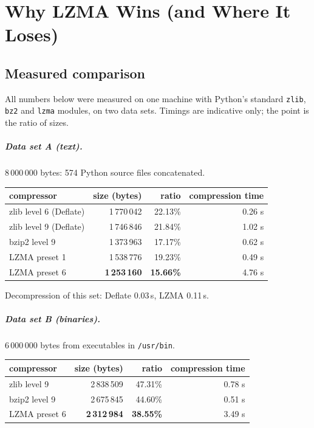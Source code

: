 \documentclass[11pt,a4paper,oneside]{book}
\begin{document}
\chapter{Why LZMA Wins (and Where It Loses)}

\section{Measured comparison}

All numbers below were measured on one machine with Python's standard \texttt{zlib}, \texttt{bz2} and \texttt{lzma} modules, on two data sets. Timings are
indicative only; the point is the ratio of sizes.

\paragraph{Data set A (text).} 8\,000\,000 bytes: 574 Python source files concatenated.
\begin{center}
\small
\begin{tabular}{lrrr}
\toprule
compressor & size (bytes) & ratio & compression time\\
\midrule
zlib level 6 (Deflate) & 1\,770\,042 & 22.13\% & 0.26 s\\
zlib level 9 (Deflate) & 1\,746\,846 & 21.84\% & 1.02 s\\
bzip2 level 9 & 1\,373\,963 & 17.17\% & 0.62 s\\
LZMA preset 1 & 1\,538\,776 & 19.23\% & 0.49 s\\
LZMA preset 6 & \textbf{1\,253\,160} & \textbf{15.66\%} & 4.76 s\\
\bottomrule
\end{tabular}
\end{center}
Decompression of this set: Deflate 0.03\,s, LZMA 0.11\,s.

\paragraph{Data set B (binaries).} 6\,000\,000 bytes from executables in \texttt{/usr/bin}.
\begin{center}
\small
\begin{tabular}{lrrr}
\toprule
compressor & size (bytes) & ratio & compression time\\
\midrule
zlib level 9 & 2\,838\,509 & 47.31\% & 0.78 s\\
bzip2 level 9 & 2\,675\,845 & 44.60\% & 0.51 s\\
LZMA preset 6 & \textbf{2\,312\,984} & \textbf{38.55\%} & 3.49 s\\
\bottomrule
\end{tabular}
\end{center}
\end{document}
